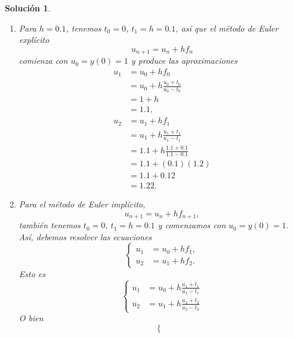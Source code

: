 \documentclass[11pt,letterpaper]{article}
\newtheorem*{sol}{Solución}
\begin{document}
\begin{sol}
  \begin{enumerate}
    \item
      Para $h=0.1$, tenemos $t_0=0$, $t_1=h=0.1$, así que el método de
      Euler explícito
      \begin{equation}
        u_{n+1} = u_n + hf_n
      \end{equation}
      comienza con $u_0=y(0)=1$ y produce las aproximaciones
      \begin{align}
        u_1
        &= u_0+hf_0 \\
        &= u_0+h \frac{u_0+t_0}{u_0-t_0} \\
        &= 1+h \\
        &= 1.1,
        \\
        u_2
        &= u_1+hf_1 \\
        &= u_1+h \frac{u_1+t_1}{u_1-t_1} \\
        &= 1.1+h \frac{1.1+0.1}{1.1-0.1} \\
        &= 1.1+(0.1)(1.2) \\
        &= 1.1 + 0.12 \\
        &= 1.22
      .\end{align}
    \item
      Para el método de Euler implícito,
      \begin{equation}
        u_{n+1} = u_n + hf_{n+1}
      ,\end{equation}
      también tenemos $t_0=0$, $t_1=h=0.1$
      y comenzamos con $u_0=y(0)=1$.
      Así, debemos resolver las ecuaciones
      \begin{equation}
        \left\{
          \begin{aligned}
            u_1 &= u_0 + hf_{1},
            \\
            u_2 &= u_1 + hf_{2}.
          \end{aligned}
        \right.
      \end{equation}
      Esto es
      \begin{equation}
        \left\{
          \begin{aligned}
            u_1 &= u_0 + h \frac{u_1+t_1}{u_1-t_1}
            \\
            u_2 &= u_1 + h \frac{u_2+t_2}{u_2-t_2}
          \end{aligned}
        \right.
      \end{equation}
      O bien
      \begin{equation}
        \left\{
          \begin{aligned}

\end{aligned}
\end{equation}
\end{enumerate}
\end{sol}
\end{document}
